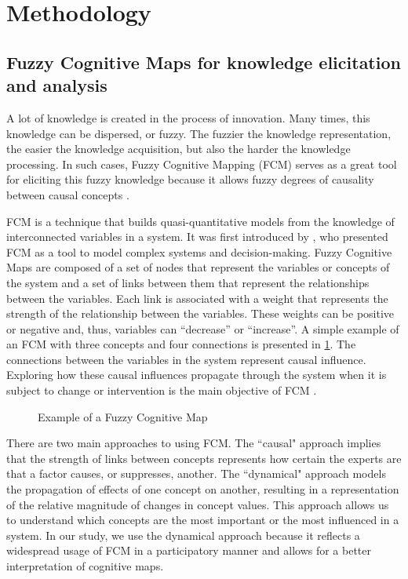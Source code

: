 \section{Methodology}

\subsection{Fuzzy Cognitive Maps for knowledge elicitation and analysis}

A lot of knowledge is created in the process of innovation. Many times, this knowledge can be dispersed, or fuzzy. The fuzzier the knowledge representation, the easier the knowledge acquisition, but also the harder the knowledge processing. In such cases, Fuzzy Cognitive Mapping (FCM) serves as a great tool for eliciting this fuzzy knowledge because it allows fuzzy degrees of causality between causal concepts \citep{kosko1986fuzzy}. 

FCM is a technique that builds quasi-quantitative models from the knowledge of interconnected variables in a system. It was first introduced by \cite{kosko1986fuzzy}, who presented FCM as a tool to model complex systems and decision-making. Fuzzy Cognitive Maps are composed of a set of nodes that represent the variables or concepts of the system and a set of links between them that represent the relationships between the variables. Each link is associated with a weight that represents the strength of the relationship between the variables. These weights can be positive or negative and, thus, variables can ``decrease'' or ``increase''. A simple example of an FCM with three concepts and four connections is presented in \cref{example_fcm}. The connections between the variables in the system represent causal influence. Exploring how these causal influences propagate through the system when it is subject to change or intervention is the main objective of FCM \citep{barbrook2022systems}.

\begin{figure}[H]
\caption{Example of a Fuzzy Cognitive Map}  
\label{example_fcm}
\centering

\end{figure}

There are two main approaches to using FCM. The ``causal" approach implies that the strength of links between concepts represents how certain the experts are that a factor causes, or suppresses, another. The ``dynamical" approach models the propagation of effects of one concept on another, resulting in a representation of the relative magnitude of changes in concept values. This approach allows us to understand which concepts are the most important or the most influenced in a system. In our study, we use the dynamical approach because it reflects a widespread usage of FCM in a participatory manner and allows for a better interpretation of cognitive maps.

